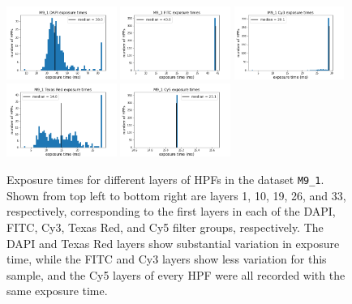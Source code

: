 \documentclass[letterpaper,11pt]{article}
\begin{document}
\begin{figure}[!ht]
\centering
\includegraphics[width=0.32\textwidth]{images/introduction/exposure_times_M9_1_layer_1}
\includegraphics[width=0.32\textwidth]{images/introduction/exposure_times_M9_1_layer_10}
\includegraphics[width=0.32\textwidth]{images/introduction/exposure_times_M9_1_layer_19}
\includegraphics[width=0.32\textwidth]{images/introduction/exposure_times_M9_1_layer_26}
\includegraphics[width=0.32\textwidth]{images/introduction/exposure_times_M9_1_layer_33}
\caption{\footnotesize Exposure times for different layers of HPFs in the dataset \texttt{M9\_1}. Shown from top left to bottom right are layers 1, 10, 19, 26, and 33, respectively, corresponding to the first layers in each of the DAPI, FITC, Cy3, Texas Red, and Cy5 filter groups, respectively. The DAPI and Texas Red layers show substantial variation in exposure time, while the FITC and Cy3 layers show less variation for this sample, and the Cy5 layers of every HPF were all recorded with the same exposure time.}
\label{fig:exposure_time_variation_M9_1}
\end{figure}
\end{document}
